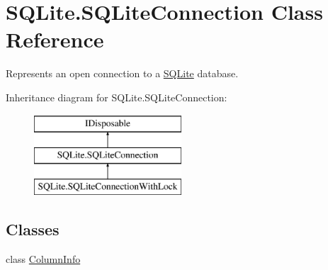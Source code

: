 \hypertarget{classSQLite_1_1SQLiteConnection}{}\section{S\+Q\+Lite.\+S\+Q\+Lite\+Connection Class Reference}
\label{classSQLite_1_1SQLiteConnection}


Represents an open connection to a \hyperlink{namespaceSQLite}{S\+Q\+Lite} database.  


Inheritance diagram for S\+Q\+Lite.\+S\+Q\+Lite\+Connection\+:\begin{figure}[H]
\begin{center}
\leavevmode
\includegraphics[height=3.000000cm]{classSQLite_1_1SQLiteConnection}
\end{center}
\end{figure}
\subsection*{Classes}
\begin{DoxyCompactItemize}
\item 
class \hyperlink{classSQLite_1_1SQLiteConnection_1_1ColumnInfo}{Column\+Info}
\end{DoxyCompactItemize}

